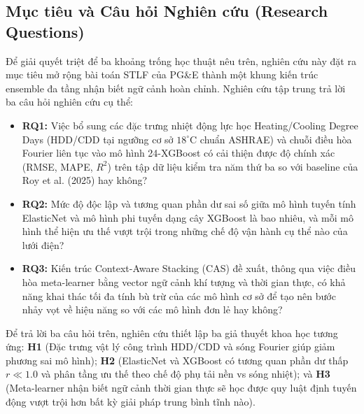 \subsection{Mục tiêu và Câu hỏi Nghiên cứu (Research Questions)}
Để giải quyết triệt để ba khoảng trống học thuật nêu trên, nghiên cứu này đặt ra mục tiêu mở rộng bài toán STLF của PG\&E thành một khung kiến trúc ensemble đa tầng nhận biết ngữ cảnh hoàn chỉnh. Nghiên cứu tập trung trả lời ba câu hỏi nghiên cứu cụ thể:

\begin{itemize}
    \item \textbf{RQ1:} Việc bổ sung các đặc trưng nhiệt động lực học Heating/Cooling Degree Days (HDD/CDD tại ngưỡng cơ sở $18^\circ\text{C}$ chuẩn ASHRAE) và chuỗi điều hòa Fourier liên tục vào mô hình 24-XGBoost có cải thiện được độ chính xác (RMSE, MAPE, $R^2$) trên tập dữ liệu kiểm tra năm thứ ba so với baseline của Roy et al. (2025) hay không?
    \item \textbf{RQ2:} Mức độ độc lập và tương quan phần dư sai số giữa mô hình tuyến tính ElasticNet và mô hình phi tuyến dạng cây XGBoost là bao nhiêu, và mỗi mô hình thể hiện ưu thế vượt trội trong những chế độ vận hành cụ thể nào của lưới điện?
    \item \textbf{RQ3:} Kiến trúc Context-Aware Stacking (CAS) đề xuất, thông qua việc điều hòa meta-learner bằng vector ngữ cảnh khí tượng và thời gian thực, có khả năng khai thác tối đa tính bù trừ của các mô hình cơ sở để tạo nên bước nhảy vọt về hiệu năng so với các mô hình đơn lẻ hay không?
\end{itemize}

Để trả lời ba câu hỏi trên, nghiên cứu thiết lập ba giả thuyết khoa học tương ứng: \textbf{H1} (Đặc trưng vật lý công trình HDD/CDD và sóng Fourier giúp giảm phương sai mô hình); \textbf{H2} (ElasticNet và XGBoost có tương quan phần dư thấp $r \ll 1.0$ và phân tầng ưu thế theo chế độ phụ tải nền vs sóng nhiệt); và \textbf{H3} (Meta-learner nhận biết ngữ cảnh thời gian thực sẽ học được quy luật định tuyến động vượt trội hơn bất kỳ giải pháp trung bình tĩnh nào).

